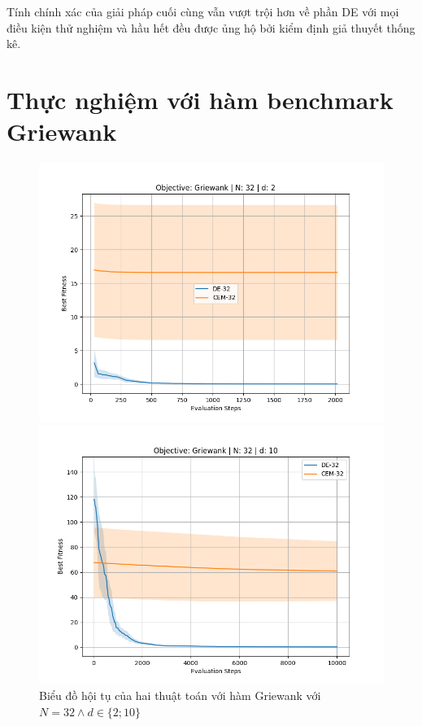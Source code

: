 \documentclass[10pt]{report}
\begin{document}
Tính chính xác của giải pháp cuối cùng vẫn vượt trội hơn về phần DE với mọi điều kiện thử nghiệm và hầu hết đều được ủng hộ bởi kiểm định giả thuyết thống kê.

\section{Thực nghiệm với hàm benchmark Griewank}
\begin{figure}[H]\centering
	\caption{Biểu đồ hội tụ của hai thuật toán với hàm Griewank với \(N = 32 \wedge d \in \{2; 10\}\)}
	\begin{minipage}{0.45\textwidth}\centering
		\includegraphics[width=\textwidth]{../assets/graphs/objective=Griewank_N=32_d=2.png}
	\end{minipage}
	\begin{minipage}{0.45\textwidth}\centering
		\includegraphics[width=\textwidth]{../assets/graphs/objective=Griewank_N=32_d=10.png}
	\end{minipage}
\end{figure}
\end{document}
